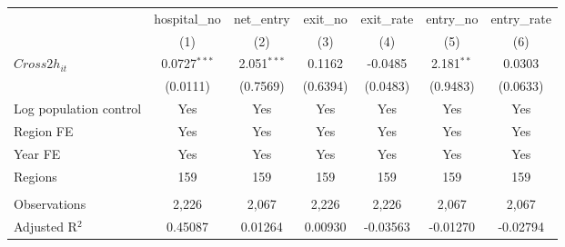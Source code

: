 \begingroup
\centering
\begin{tabular}{lcccccc}
   \toprule
                          & hospital\_no   & net\_entry    & exit\_no  & exit\_rate  & entry\_no    & entry\_rate \\    
                          & (1)            & (2)           & (3)       & (4)         & (5)          & (6)\\  
   \midrule 
   $Cross2h_{it}$         & 0.0727$^{***}$ & 2.051$^{***}$ & 0.1162    & -0.0485     & 2.181$^{**}$ & 0.0303\\   
                          & (0.0111)       & (0.7569)      & (0.6394)  & (0.0483)    & (0.9483)     & (0.0633)\\   
   Log population control & Yes            & Yes           & Yes       & Yes         & Yes          & Yes\\  
   Region FE              & Yes            & Yes           & Yes       & Yes         & Yes          & Yes\\  
   Year FE                & Yes            & Yes           & Yes       & Yes         & Yes          & Yes\\  
   Regions                & 159            & 159           & 159       & 159         & 159          & 159\\  
    \\
   Observations           & 2,226          & 2,067         & 2,226     & 2,226       & 2,067        & 2,067\\  
   Adjusted R$^2$         & 0.45087        & 0.01264       & 0.00930   & -0.03563    & -0.01270     & -0.02794\\  
   \bottomrule
\end{tabular}
\par\endgroup

